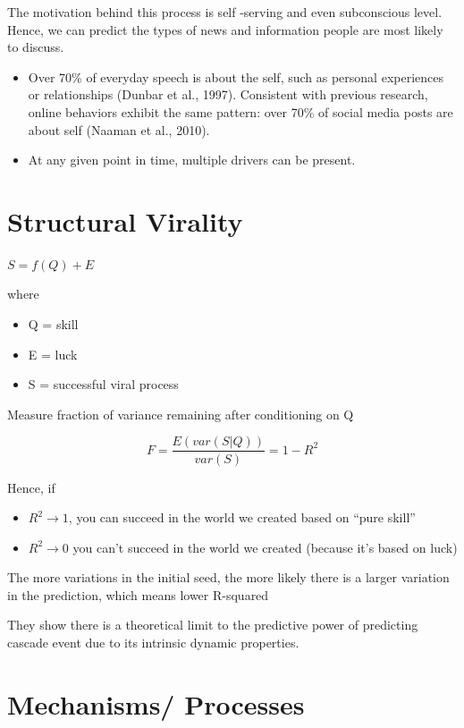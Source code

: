\documentclass[
]{book}
\providecommand{\tightlist}{%
  \setlength{\itemsep}{0pt}\setlength{\parskip}{0pt}}
\begin{document}
The motivation behind this process is self -serving and even subconscious level. Hence, we can predict the types of news and information people are most likely to discuss.

\begin{itemize}
\tightlist
\item
  Over 70\% of everyday speech is about the self, such as personal experiences or relationships (Dunbar et al., 1997). Consistent with previous research, online behaviors exhibit the same pattern: over 70\% of social media posts are about self (Naaman et al., 2010).
\item
  At any given point in time, multiple drivers can be present.
\end{itemize}

\hypertarget{structural-virality}{%
\section{Structural Virality}\label{structural-virality}}

\citep{Goel_2015}

\(S = f(Q) + E\)

where

\begin{itemize}
\item
  Q = skill
\item
  E = luck
\item
  S = successful viral process
\end{itemize}

Measure fraction of variance remaining after conditioning on Q

\[
F = \frac{E(var(S|Q))}{var(S)} = 1 - R^2
\]

Hence, if

\begin{itemize}
\item
  \(R^2 \to 1\), you can succeed in the world we created based on ``pure skill''
\item
  \(R^2 \to 0\) you can't succeed in the world we created (because it's based on luck)
\end{itemize}

The more variations in the initial seed, the more likely there is a larger variation in the prediction, which means lower R-squared

They show there is a theoretical limit to the predictive power of predicting cascade event due to its intrinsic dynamic properties.

\hypertarget{mechanisms-processes}{%
\section{Mechanisms/ Processes}\label{mechanisms-processes}}
\end{document}
